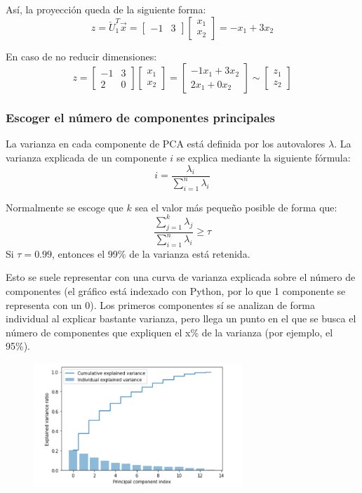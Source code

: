 Así, la proyección queda de la siguiente forma:
$$z = \breve{U}_1^T \vec{x} =  \begin{bmatrix}
-1 & 3
\end{bmatrix} \begin{bmatrix}
x_1 \\ x_2
\end{bmatrix} = -x_1 + 3 x_2$$

En caso de no reducir dimensiones:
$$z = \begin{bmatrix}
-1 & 3 \\ 2 & 0
\end{bmatrix} \begin{bmatrix}
x_1 \\ x_2
\end{bmatrix} = \begin{bmatrix}
-1 x_1 + 3 x_2 \\
2 x_1 + 0 x_2
\end{bmatrix} \sim \begin{bmatrix}
z_1 \\ z_2
\end{bmatrix}$$

\subsubsection{Escoger el número de componentes principales}
La varianza en cada componente de PCA está definida por los autovalores $\lambda$. La varianza explicada de un componente $i$ se explica mediante la siguiente fórmula:
$$i = \frac{\lambda_i}{\sum^n_{i=1} \lambda_i}$$

Normalmente se escoge que $k$ sea el valor más pequeño posible de forma que:
$$\frac{\sum^k_{j=1} \lambda_j}{\sum^n_{i=1} \lambda_i} \geq \tau$$
Si $\tau = 0.99$, entonces el 99\% de la varianza está retenida.

Esto se suele representar con una curva de varianza explicada sobre el número de componentes (el gráfico está indexado con Python, por lo que 1 componente se representa con un 0). Los primeros componentes sí se analizan de forma individual al explicar bastante varianza, pero llega un punto en el que se busca el número de componentes que expliquen el x\% de la varianza (por ejemplo, el 95\%).
\begin{figure}[h]
\centering
\includegraphics[width = 0.7\textwidth]{figs/explained-var.png}
\end{figure} 

